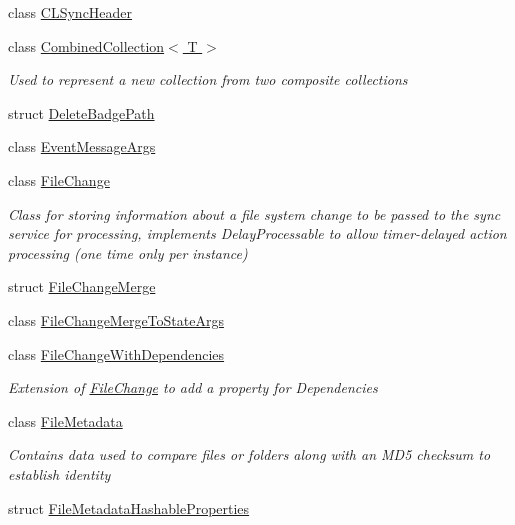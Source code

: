 \begin{DoxyCompactItemize}
\item 
class \hyperlink{class_cloud_api_public_1_1_model_1_1_c_l_sync_header}{C\-L\-Sync\-Header}
\item 
class \hyperlink{class_cloud_api_public_1_1_model_1_1_combined_collection_3_01_t_01_4}{Combined\-Collection$<$ T $>$}
\begin{DoxyCompactList}\small\item\em Used to represent a new collection from two composite collections \end{DoxyCompactList}\item 
struct \hyperlink{struct_cloud_api_public_1_1_model_1_1_delete_badge_path}{Delete\-Badge\-Path}
\item 
class \hyperlink{class_cloud_api_public_1_1_model_1_1_event_message_args}{Event\-Message\-Args}
\item 
class \hyperlink{class_cloud_api_public_1_1_model_1_1_file_change}{File\-Change}
\begin{DoxyCompactList}\small\item\em Class for storing information about a file system change to be passed to the sync service for processing, implements Delay\-Processable to allow timer-\/delayed action processing (one time only per instance) \end{DoxyCompactList}\item 
struct \hyperlink{struct_cloud_api_public_1_1_model_1_1_file_change_merge}{File\-Change\-Merge}
\item 
class \hyperlink{class_cloud_api_public_1_1_model_1_1_file_change_merge_to_state_args}{File\-Change\-Merge\-To\-State\-Args}
\item 
class \hyperlink{class_cloud_api_public_1_1_model_1_1_file_change_with_dependencies}{File\-Change\-With\-Dependencies}
\begin{DoxyCompactList}\small\item\em Extension of \hyperlink{class_cloud_api_public_1_1_model_1_1_file_change}{File\-Change} to add a property for Dependencies \end{DoxyCompactList}\item 
class \hyperlink{class_cloud_api_public_1_1_model_1_1_file_metadata}{File\-Metadata}
\begin{DoxyCompactList}\small\item\em Contains data used to compare files or folders along with an M\-D5 checksum to establish identity \end{DoxyCompactList}\item 
struct \hyperlink{struct_cloud_api_public_1_1_model_1_1_file_metadata_hashable_properties}{File\-Metadata\-Hashable\-Properties}

\end{DoxyCompactItemize}
